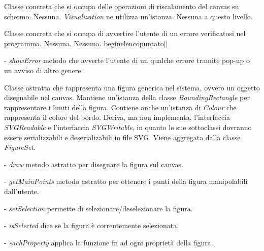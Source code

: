 Classe concreta che si occupa delle operazioni di riscalamento del canvas su schermo. 
Nessuna.
\textit{Visualization} ne utilizza un'istanza.
Nessuna a questo livello.

Classe concreta che si occupa di avvertire l'utente di un errore verificatosi nel programma.
Nessuna.
Nessuna.
begin{elencopuntato}[\normindent]
\begin{elencopuntato}[\normindent]
\item[-]  \textit{showError} metodo che avverte l'utente di un qualche errore tramite pop-up o un avviso di altro genere.
\end{elencopuntato}


Classe astratta che rappresenta una figura generica nel sistema, ovvero un oggetto disegnabile nel canvas.
Mantiene un'istanza della classe \textit{BoundingRectangle} per rappresentare i limiti della figura. Contiene anche un'istanza di \textit{Colour} che rappresenta il colore del bordo. Deriva, ma non implementa, l'interfaccia \textit{SVGReadable} e l'interfaccia \textit{SVGWritable}, in quanto le sue sottoclassi dovranno essere serializzabili e deserializabili in file SVG.
Viene aggregata dalla classe \textit{FigureSet}.
\begin{elencopuntato}[\normindent]
\item[-]  \textit{draw} metodo astratto per disegnare la figura sul canvas.
\item[-]  \textit{getMainPoints} metodo astratto per ottenere i punti della figura manipolabili dall'utente.
\item[-]  \textit{setSelection} permette di selezionare/deselezionare la figura.
\item[-]  \textit{isSelected} dice se la figura \`e correntemente selezionata.
\item[-]  \textit{eachProperty} applica la funzione fn ad ogni propriet\`a della figura.
\end{elencopuntato}

